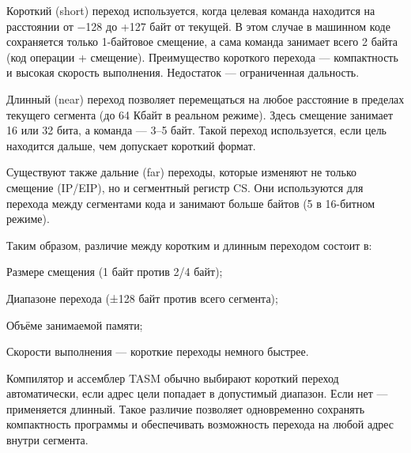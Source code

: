 Короткий (short) переход используется, когда целевая команда находится на расстоянии от −128 до +127 байт от текущей. В этом случае в машинном коде сохраняется только 1-байтовое смещение, а сама команда занимает всего 2 байта (код операции + смещение).
Преимущество короткого перехода — компактность и высокая скорость выполнения. Недостаток — ограниченная дальность.

Длинный (near) переход позволяет перемещаться на любое расстояние в пределах текущего сегмента (до 64 Кбайт в реальном режиме). Здесь смещение занимает 16 или 32 бита, а команда — 3–5 байт. Такой переход используется, если цель находится дальше, чем допускает короткий формат.

Существуют также дальние (far) переходы, которые изменяют не только смещение (IP/EIP), но и сегментный регистр CS. Они используются для перехода между сегментами кода и занимают больше байтов (5 в 16-битном режиме).

Таким образом, различие между коротким и длинным переходом состоит в:

Размере смещения (1 байт против 2/4 байт);

Диапазоне перехода (±128 байт против всего сегмента);

Объёме занимаемой памяти;

Скорости выполнения — короткие переходы немного быстрее.

Компилятор и ассемблер TASM обычно выбирают короткий переход автоматически, если адрес цели попадает в допустимый диапазон. Если нет — применяется длинный. Такое различие позволяет одновременно сохранять компактность программы и обеспечивать возможность перехода на любой адрес внутри сегмента.

\endinput
